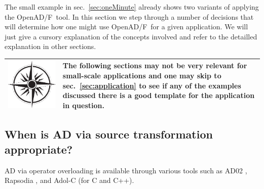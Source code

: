 \documentclass{book}
\newcommand{\OpenADF}{OpenAD/F}
\newcommand{\refsec}[1]{{sec.~\ref{#1}}}
\newcommand{\nav}[1]{
\begin{tabular}{|m{.03\textwidth}|m{.92\textwidth}|}\hline
\vspace{1mm}
\includegraphics[width=.03\textwidth]{windrose_zh1}&
\vspace{1mm}
\begin{minipage}[c]{.86\textwidth}
\small {#1}
\end{minipage}
\vspace{1mm}
\\\hline
\end{tabular}
}
\begin{document}
The small example in \refsec{sec:oneMinute} already shows two variants of applying the \OpenADF\ tool. 
In this section we step through a number of decisions that will determine how one might use 
\OpenADF\ for a given application. We will just give a cursory explanation of the 
concepts involved and refer to the detailled explanation in other sections.\\ 
\nav{The following sections may not be very relevant for small-scale applications 
and one may skip 
to \refsec{sec:application} to see if any of the examples discussed there is a good template for 
the application in question.}

\subsection{When is AD via source transformation appropriate?}\label{sec:sourceTransformApprop}
AD via operator overloading is available through various tools such as 
AD02 \cite{ad02}, Rapsodia \cite{rapsodiaWeb}, and Adol-C \cite{adolcWeb} (for C and C++). 
\end{document}
